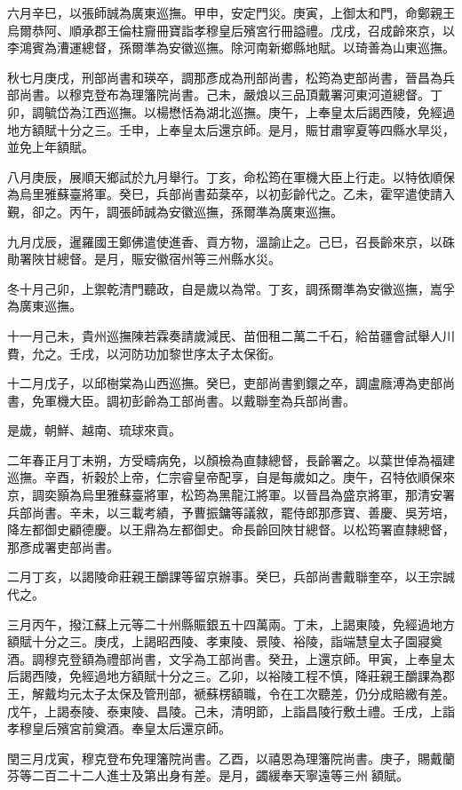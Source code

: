 \begin{pinyinscope}
六月辛巳，以張師誠為廣東巡撫。甲申，安定門災。庚寅，上御太和門，命鄭親王烏爾恭阿、順承郡王倫柱齎冊寶詣孝穆皇后殯宮行冊謚禮。戊戌，召成齡來京，以李鴻賓為漕運總督，孫爾準為安徽巡撫。除河南新鄉縣地賦。以琦善為山東巡撫。

秋七月庚戌，刑部尚書和瑛卒，調那彥成為刑部尚書，松筠為吏部尚書，晉昌為兵部尚書。以穆克登布為理籓院尚書。己未，嚴烺以三品頂戴署河東河道總督。丁卯，調毓岱為江西巡撫。以楊懋恬為湖北巡撫。庚午，上奉皇太后謁西陵，免經過地方額賦十分之三。壬申，上奉皇太后還京師。是月，賑甘肅寧夏等四縣水旱災，並免上年額賦。

八月庚辰，展順天鄉試於九月舉行。丁亥，命松筠在軍機大臣上行走。以特依順保為烏里雅蘇臺將軍。癸巳，兵部尚書茹棻卒，以初彭齡代之。乙未，霍罕遣使請入覲，卻之。丙午，調張師誠為安徽巡撫，孫爾準為廣東巡撫。

九月戊辰，暹羅國王鄭佛遣使進香、貢方物，溫諭止之。己巳，召長齡來京，以硃勛署陜甘總督。是月，賑安徽宿州等三州縣水災。

冬十月己卯，上禦乾清門聽政，自是歲以為常。丁亥，調孫爾準為安徽巡撫，嵩孚為廣東巡撫。

十一月己未，貴州巡撫陳若霖奏請歲減民、苗佃租二萬二千石，給苗疆會試舉人川費，允之。壬戌，以河防功加黎世序太子太保銜。

十二月戊子，以邱樹棠為山西巡撫。癸巳，吏部尚書劉鐶之卒，調盧廕溥為吏部尚書，免軍機大臣。調初彭齡為工部尚書。以戴聯奎為兵部尚書。

是歲，朝鮮、越南、琉球來貢。

二年春正月丁未朔，方受疇病免，以顏檢為直隸總督，長齡署之。以葉世倬為福建巡撫。辛酉，祈穀於上帝，仁宗睿皇帝配享，自是每歲如之。庚午，召特依順保來京，調奕顥為烏里雅蘇臺將軍，松筠為黑龍江將軍。以晉昌為盛京將軍，那清安署兵部尚書。辛未，以三載考績，予曹振鏞等議敘，罷侍郎那彥寶、善慶、吳芳培，降左都御史顧德慶。以王鼎為左都御史。命長齡回陜甘總督。以松筠署直隸總督，那彥成署吏部尚書。

二月丁亥，以謁陵命莊親王釂課等留京辦事。癸巳，兵部尚書戴聯奎卒，以王宗誠代之。

三月丙午，撥江蘇上元等二十州縣賑銀五十四萬兩。丁未，上謁東陵，免經過地方額賦十分之三。庚戌，上謁昭西陵、孝東陵、景陵、裕陵，詣端慧皇太子園寢奠酒。調穆克登額為禮部尚書，文孚為工部尚書。癸丑，上還京師。甲寅，上奉皇太后謁西陵，免經過地方額賦十分之三。乙卯，以裕陵工程不慎，降莊親王釂課為郡王，解戴均元太子太保及管刑部，褫蘇楞額職，令在工次聽差，仍分成賠繳有差。戊午，上謁泰陵、泰東陵、昌陵。己未，清明節，上詣昌陵行敷土禮。壬戌，上詣孝穆皇后殯宮前奠酒。奉皇太后還京師。

閏三月戊寅，穆克登布免理籓院尚書。乙酉，以禧恩為理籓院尚書。庚子，賜戴蘭芬等二百二十二人進士及第出身有差。是月，蠲緩奉天寧遠等三州額賦。


\end{pinyinscope}
